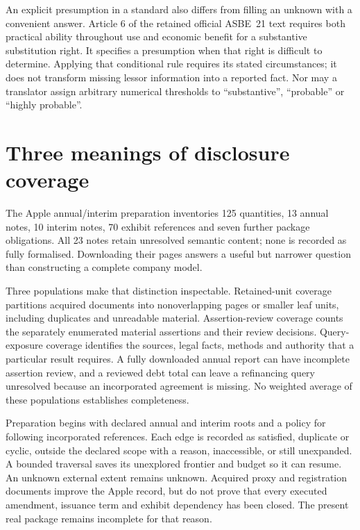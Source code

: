 An explicit presumption in a standard also differs from filling an unknown with
a convenient answer. Article 6 of the retained official ASBE~21 text requires
both practical ability throughout use and economic benefit for a substantive
substitution right. It specifies a presumption when that right is difficult to
determine. Applying that conditional rule requires its stated circumstances;
it does not transform missing lessor information into a reported fact. Nor may
a translator assign arbitrary numerical thresholds to ``substantive'',
``probable'' or ``highly probable''.

\section{Three meanings of disclosure coverage}

The Apple annual/interim preparation inventories 125 quantities, 13 annual notes,
10 interim notes, 70 exhibit references and seven further package obligations.
All 23 notes retain unresolved semantic content; none is recorded as fully
formalised. Downloading their pages answers a useful but narrower question
than constructing a complete company model.

Three populations make that distinction inspectable. Retained-unit coverage
partitions acquired documents into nonoverlapping pages or smaller leaf units,
including duplicates and unreadable material. Assertion-review coverage counts
the separately enumerated material assertions and their review decisions.
Query-exposure coverage identifies the sources, legal facts, methods and
authority that a particular result requires. A fully downloaded annual report
can have incomplete assertion review, and a reviewed debt total can leave a
refinancing query unresolved because an incorporated agreement is missing.
No weighted average of these populations establishes completeness.

Preparation begins with declared annual and interim roots and a policy for
following incorporated references. Each edge is recorded as satisfied,
duplicate or cyclic, outside the declared scope with a reason, inaccessible,
or still unexpanded. A bounded traversal saves its unexplored frontier and
budget so it can resume. An unknown external extent remains unknown. Acquired
proxy and registration documents improve the Apple record, but do not prove
that every executed amendment, issuance term and exhibit dependency has been
closed. The present real package remains incomplete for that reason.

